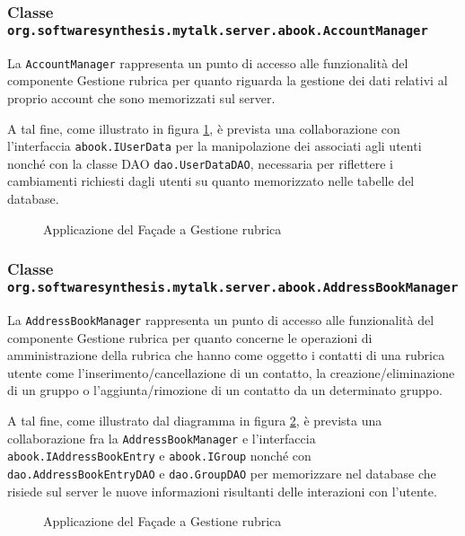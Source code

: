 \subsubsection*{Classe \texttt{org.softwaresynthesis.mytalk.server.abook.AccountManager}}
La  \texttt{AccountManager} rappresenta un punto di accesso alle funzionalità del componente \textsf{Gestione rubrica} per quanto riguarda la gestione dei dati relativi al proprio account che sono memorizzati sul server.

A tal fine, come illustrato in figura \ref{fig:facadeaddressbook1}, è prevista una collaborazione con l'interfaccia \texttt{abook.IUserData} per la manipolazione dei  associati agli utenti nonché con la classe DAO \texttt{dao.UserDataDAO}, necessaria per riflettere i cambiamenti richiesti dagli utenti su quanto memorizzato nelle tabelle del database.

\begin{figure}[H]
  \centering
  \caption{Applicazione del  Façade a \textsf{Gestione rubrica}}\label{fig:facadeaddressbook1}
\end{figure}

\subsubsection*{Classe \texttt{org.softwaresynthesis.mytalk.server.abook.AddressBookManager}}
La  \texttt{AddressBookManager} rappresenta un punto di accesso alle funzionalità del componente \textsf{Gestione rubrica} per quanto concerne le operazioni di amministrazione della rubrica che hanno come oggetto i contatti di una rubrica utente come l'inserimento/cancellazione di un contatto, la creazione/eliminazione di un gruppo o l'aggiunta/rimozione di un contatto da un determinato gruppo.

A tal fine, come illustrato dal diagramma in figura \ref{fig:facadeaddressbook2}, è prevista una collaborazione fra la  \texttt{AddressBookManager} e l'interfaccia \texttt{abook.IAddressBookEntry} e \texttt{abook.IGroup} nonché con \texttt{dao.AddressBookEntryDAO} e \texttt{dao.GroupDAO} per memorizzare nel database che risiede sul server le nuove informazioni risultanti delle interazioni con l'utente.

\begin{figure}[H]
  \centering
  \caption{Applicazione del  Façade a \textsf{Gestione rubrica}}\label{fig:facadeaddressbook2}
\end{figure}

